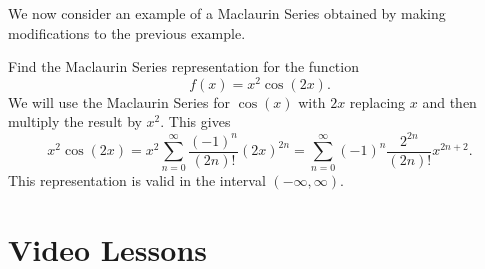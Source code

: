 \documentclass{ximera}
\begin{document}
We now consider an example of a Maclaurin Series obtained by making modifications to the previous example.

\begin{example}[example 7]
Find the Maclaurin Series representation for the function 
\[
f(x) = x^2\cos(2x).
\]
We will use the Maclaurin Series for $\cos(x)$ with $2x$ replacing $x$ and then multiply the result by $x^2$.
This gives
\[
x^2\cos(2x) = x^2\sum_{n=0}^\infty \frac{(-1)^n}{(2n)!}(2x)^{2n} = \sum_{n=0}^\infty (-1)^n\frac{2^{2n}}{(2n)!}x^{2n+2}.
\]
This representation is valid in the interval $(-\infty, \infty)$.
\end{example}


\section{Video Lessons}


\begin{center}
\begin{foldable}
\end{foldable}
\end{center}
\end{document}
